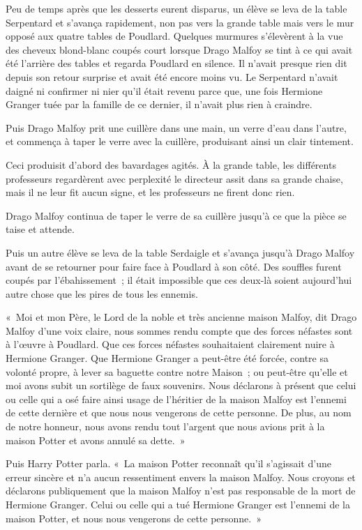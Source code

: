 Peu de temps après que les desserts eurent disparus, un élève se leva de la table Serpentard et s'avança rapidement, non pas vers la grande table mais vers le mur opposé aux quatre tables de Poudlard.
Quelques murmures s'élevèrent à la vue des cheveux blond-blanc coupés court lorsque Drago Malfoy se tint à ce qui avait été l'arrière des tables et regarda Poudlard en silence.
Il n'avait presque rien dit depuis son retour surprise et avait été encore moins vu.
Le Serpentard n'avait daigné ni confirmer ni nier qu'il était revenu parce que, une fois Hermione Granger tuée par la famille de ce dernier, il n'avait plus rien à craindre.

Puis Drago Malfoy prit une cuillère dans une main, un verre d'eau dans l'autre, et commença à taper le verre avec la cuillère, produisant ainsi un clair tintement.

Ceci produisit d'abord des bavardages agités.
À la grande table, les différents professeurs regardèrent avec perplexité le directeur assit dans sa grande chaise, mais il ne leur fit aucun signe, et les professeurs ne firent donc rien.

Drago Malfoy continua de taper le verre de sa cuillère jusqu'à ce que la pièce se taise et attende.

Puis un autre élève se leva de la table Serdaigle et s'avança jusqu'à Drago Malfoy avant de se retourner pour faire face à Poudlard à son côté.
Des souffles furent coupés par l'ébahissement~; il était impossible que ces deux-là soient aujourd'hui autre chose que les pires de tous les ennemis.

«~Moi et mon Père, le Lord de la noble et très ancienne maison Malfoy, dit Drago Malfoy d'une voix claire, nous sommes rendu compte que des forces néfastes sont à l'œuvre à Poudlard.
Que ces forces néfastes souhaitaient clairement nuire à Hermione Granger.
Que Hermione Granger a peut-être été forcée, contre sa volonté propre, à lever sa baguette contre notre Maison~; ou peut-être qu'elle et moi avons subit un sortilège de faux souvenirs.
Nous déclarons à présent que celui ou celle qui a osé faire ainsi usage de l'héritier de la maison Malfoy est l'ennemi de cette dernière et que nous nous vengerons de cette personne.
De plus, au nom de notre honneur, nous avons rendu tout l'argent que nous avions prit à la maison Potter et avons annulé sa dette.~»

Puis Harry Potter parla.
«~La maison Potter reconnaît qu'il s'agissait d'une erreur sincère et n'a aucun ressentiment envers la maison Malfoy.
Nous croyons et déclarons publiquement que la maison Malfoy n'est pas responsable de la mort de Hermione Granger.
Celui ou celle qui a tué Hermione Granger est l'ennemi de la maison Potter, et nous nous vengerons de cette personne.~»

